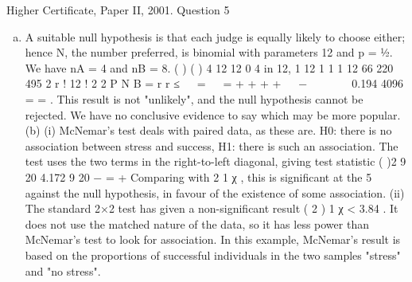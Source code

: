 \documentclass[a4paper,12pt]{article}
\begin{document}


Higher Certificate, Paper II, 2001. Question 5
\begin{enumerate}[(a)]
\item  A suitable null hypothesis is that each judge is equally likely to choose either;
hence N, the number preferred, is binomial with parameters 12 and p = ½. We have
nA = 4 and nB = 8.
( ) ( ) { }
4 12
12
0
4 in 12, 1 12 1 1 1 12 66 220 495
2 r ! 12 ! 2 2
P N B
= r r
≤   =   = + + + +   −        0.194
4096
= = .
This result is not "unlikely", and the null hypothesis cannot be rejected. We have no
conclusive evidence to say which may be more popular.
(b) (i) McNemar's test deals with paired data, as these are.
H0: there is no association between stress and success,
H1: there is such an association.
The test uses the two terms in the right-to-left diagonal, giving test statistic
( )2 9 20
4.172
9 20
−
=
+
Comparing with 2
1 χ , this is significant at the 5%
against the null hypothesis, in favour of the existence of some association.
(ii) The standard 2×2 test has given a non-significant result ( 2 )
1 χ < 3.84 . It
does not use the matched nature of the data, so it has less power than
McNemar's test to look for association. In this example, McNemar's result is
based on the proportions of successful individuals in the two samples "stress"
and "no stress".

\end{enumerate}
\end{document}
